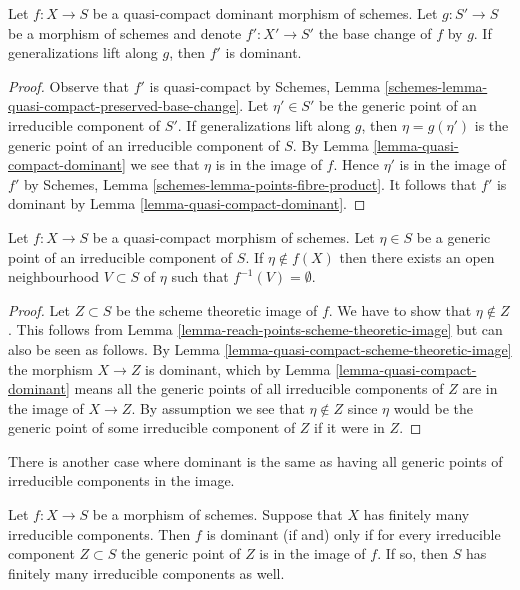 \begin{lemma}
\label{lemma-base-change-dominant}
Let $f : X \to S$ be a quasi-compact dominant morphism of schemes.
Let $g : S' \to S$ be a morphism of schemes and denote $f' : X' \to S'$
the base change of $f$ by $g$. If generalizations lift along $g$,
then $f'$ is dominant.
\end{lemma}

\begin{proof}
Observe that $f'$ is quasi-compact by Schemes, Lemma
\ref{schemes-lemma-quasi-compact-preserved-base-change}.
Let $\eta' \in S'$ be the generic point of an irreducible
component of $S'$. If generalizations lift along $g$,
then $\eta = g(\eta')$ is the generic point of an irreducible
component of $S$. By Lemma \ref{lemma-quasi-compact-dominant}
we see that $\eta$ is in the image of $f$.
Hence $\eta'$ is in the image of $f'$ by
Schemes, Lemma \ref{schemes-lemma-points-fibre-product}.
It follows that $f'$ is dominant by Lemma \ref{lemma-quasi-compact-dominant}.
\end{proof}

\begin{lemma}
\label{lemma-quasi-compact-generic-point-not-in-image}
Let $f : X \to S$ be a quasi-compact morphism of schemes.
Let $\eta \in S$ be a generic point of an irreducible
component of $S$. If $\eta \not \in f(X)$ then there
exists an open neighbourhood $V \subset S$ of $\eta$
such that $f^{-1}(V) = \emptyset$.
\end{lemma}

\begin{proof}
Let $Z \subset S$ be the scheme theoretic image of $f$.
We have to show that $\eta \not \in Z$.
This follows from
Lemma \ref{lemma-reach-points-scheme-theoretic-image}
but can also be seen as follows.
By Lemma \ref{lemma-quasi-compact-scheme-theoretic-image}
the morphism $X \to Z$ is dominant, which by
Lemma \ref{lemma-quasi-compact-dominant}
means all the generic points of all irreducible components of $Z$
are in the image of $X \to Z$. By assumption we see that
$\eta \not \in Z$ since $\eta$ would be the generic
point of some irreducible component of $Z$ if it were in $Z$.
\end{proof}

\noindent
There is another case where dominant is the same as having all
generic points of irreducible components in the image.

\begin{lemma}
\label{lemma-dominant-finite-number-irreducible-components}
Let $f : X \to S$ be a morphism of schemes.
Suppose that $X$ has finitely many irreducible components.
Then $f$ is dominant (if and) only if for every irreducible
component $Z \subset S$ the generic point of $Z$ is in the
image of $f$. If so, then $S$ has finitely many irreducible
components as well.
\end{lemma}

